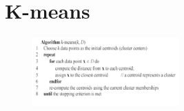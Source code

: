 \documentclass[10pt,oneside,a4paper]{article}
\begin{document}

















\section{K-means}
\begin{figure}[H]
    \centering
    \includegraphics[width=0.5\textwidth]{Images/kmeans.png}
\end{figure}
\end{document}
